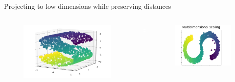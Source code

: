 \documentclass{beamer}
\begin{document}
\begin{frame}{Projecting to low dimensions while preserving distances}
    \begin{columns}
        \begin{column}{0.4\textwidth}
            \begin{figure}
                \includegraphics[width=1.4\textwidth]{standalone/mds_1.png}
                
            \end{figure}   
        \end{column}
        \begin{column}{0.01\textwidth}
            \huge{$\Longrightarrow$}
            
        \end{column}
        \begin{column}{0.4\textwidth}
            \begin{figure}
            \includegraphics[width=\textwidth]{standalone/mds_2.png}
            
        \end{figure}   
        \end{column}
    \end{columns}
    \centering
    \vfill
    \tiny{\cite{scikit-learn}}

\end{frame}
\end{document}
